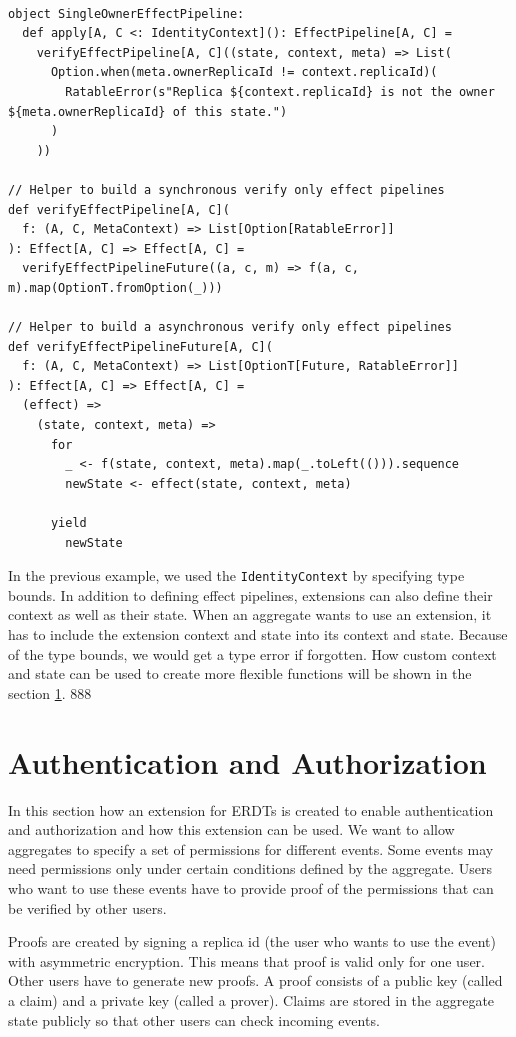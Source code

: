 \documentclass[
	english,
	ruledheaders=section,   %
	class=report,		    %
	thesis={type=bachelor}, %
	accentcolor=9c,			%
	custommargins=true,    %
	marginpar=false,        %
	parskip=half-,          %
	fontsize=11pt,          %
]{tudapub}
\begin{document}
\begin{lstlisting}
  
object SingleOwnerEffectPipeline:
  def apply[A, C <: IdentityContext](): EffectPipeline[A, C] =
    verifyEffectPipeline[A, C]((state, context, meta) => List(
      Option.when(meta.ownerReplicaId != context.replicaId)(
        RatableError(s"Replica ${context.replicaId} is not the owner ${meta.ownerReplicaId} of this state.")
      )
    ))

// Helper to build a synchronous verify only effect pipelines
def verifyEffectPipeline[A, C](
  f: (A, C, MetaContext) => List[Option[RatableError]]
): Effect[A, C] => Effect[A, C] =
  verifyEffectPipelineFuture((a, c, m) => f(a, c, m).map(OptionT.fromOption(_)))
  
// Helper to build a asynchronous verify only effect pipelines
def verifyEffectPipelineFuture[A, C](
  f: (A, C, MetaContext) => List[OptionT[Future, RatableError]]
): Effect[A, C] => Effect[A, C] =
  (effect) =>
    (state, context, meta) => 
      for
        _ <- f(state, context, meta).map(_.toLeft(())).sequence
        newState <- effect(state, context, meta)

      yield
        newState

\end{lstlisting}

In the previous example, we used the \texttt{IdentityContext} by specifying type bounds. In addition to defining effect pipelines, extensions can also define their context as well as their state. When an aggregate wants to use an extension, it has to include the extension context and state into its context and state. Because of the type bounds, we would get a type error if forgotten. How custom context and state can be used to create more flexible functions will be shown in the section \ref{sec:auth}.
888
\section{Authentication and Authorization} \label{sec:auth}
In this section how an extension for ERDTs is created to enable authentication and authorization and how this extension can be used. We want to allow aggregates to specify a set of permissions for different events. Some events may need permissions only under certain conditions defined by the aggregate. Users who want to use these events have to provide proof of the permissions that can be verified by other users.

Proofs are created by signing a replica id (the user who wants to use the event) with asymmetric encryption. This means that proof is valid only for one user. Other users have to generate new proofs. A proof consists of a public key (called a claim) and a private key (called a prover). Claims are stored in the aggregate state publicly so that other users can check incoming events.
\end{document}
